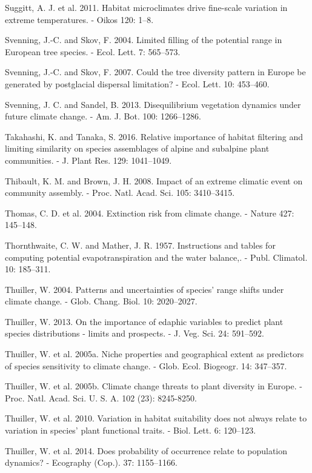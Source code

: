 \documentclass[11pt,twoside]{reedthesis}
\begin{document}
Suggitt, A. J. et al. 2011. Habitat microclimates drive fine-scale
variation in extreme temperatures. - Oikos 120: 1--8.\par
Svenning, J.-C. and Skov, F. 2004. Limited filling of the potential
range in European tree species. - Ecol. Lett. 7: 565--573.\par
Svenning, J.-C. and Skov, F. 2007. Could the tree diversity pattern in
Europe be generated by postglacial dispersal limitation? - Ecol. Lett.
10: 453--460.\par
Svenning, J. C. and Sandel, B. 2013. Disequilibrium vegetation dynamics
under future climate change. - Am. J. Bot. 100: 1266--1286.\par
Takahashi, K. and Tanaka, S. 2016. Relative importance of habitat
filtering and limiting similarity on species assemblages of alpine and
subalpine plant communities. - J. Plant Res. 129: 1041--1049.\par
Thibault, K. M. and Brown, J. H. 2008. Impact of an extreme climatic
event on community assembly. - Proc. Natl. Acad. Sci. 105:
3410--3415.\par
Thomas, C. D. et al. 2004. Extinction risk from climate change. - Nature
427: 145--148.\par
Thornthwaite, C. W. and Mather, J. R. 1957. Instructions and tables for
computing potential evapotranspiration and the water balance,. - Publ.
Climatol. 10: 185--311.\par
Thuiller, W. 2004. Patterns and uncertainties of species' range shifts
under climate change. - Glob. Chang. Biol. 10: 2020--2027.\par
Thuiller, W. 2013. On the importance of edaphic variables to predict
plant species distributions - limits and prospects. - J. Veg. Sci. 24:
591--592.\par
Thuiller, W. et al. 2005a. Niche properties and geographical extent as
predictors of species sensitivity to climate change. - Glob. Ecol.
Biogeogr. 14: 347--357.\par
Thuiller, W. et al. 2005b. Climate change threats to plant diversity in
Europe. - Proc. Natl. Acad. Sci. U. S. A. 102 (23): 8245-8250.\par
Thuiller, W. et al. 2010. Variation in habitat suitability does not
always relate to variation in species' plant functional traits. - Biol.
Lett. 6: 120--123.\par
Thuiller, W. et al. 2014. Does probability of occurrence relate to
population dynamics? - Ecography (Cop.). 37: 1155--1166.\par
\end{document}
